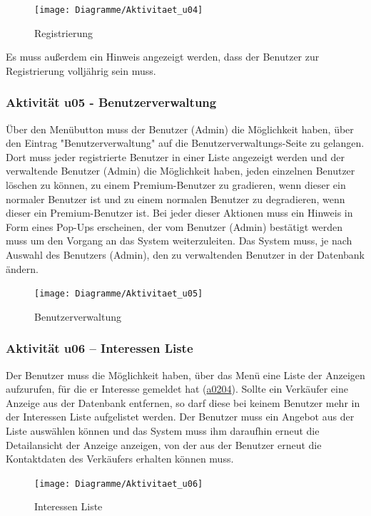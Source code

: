 \documentclass[a4paper,12pt,oneside]{scrartcl}
\begin{document}
\begin{figure}[!htbp]
\centering
\noindent\texttt{[image: Diagramme/Aktivitaet\_u04]}
\caption{Registrierung}
\end{figure}
\FloatBarrier
Es muss außerdem ein Hinweis angezeigt werden, dass der Benutzer zur Registrierung volljährig sein muss.



\subsubsection{Aktivität u05 - Benutzerverwaltung}
Über den Menübutton muss der Benutzer (Admin) die Möglichkeit haben, über den Eintrag "Benutzerverwaltung" auf die Benutzerverwaltungs-Seite zu gelangen. 
Dort muss jeder registrierte Benutzer in einer Liste angezeigt werden und der verwaltende Benutzer (Admin) die Möglichkeit haben, jeden einzelnen Benutzer löschen zu können, zu einem Premium-Benutzer zu gradieren, wenn dieser ein normaler Benutzer ist und zu einem normalen Benutzer zu degradieren, wenn dieser ein Premium-Benutzer ist. 
Bei jeder dieser Aktionen muss ein Hinweis in Form eines Pop-Ups erscheinen, der vom Benutzer (Admin) bestätigt werden muss um den Vorgang an das System weiterzuleiten. 
Das System muss, je nach Auswahl des Benutzers (Admin), den zu verwaltenden Benutzer in der Datenbank ändern.

\begin{figure}[!htbp]
\centering
\noindent\texttt{[image: Diagramme/Aktivitaet\_u05]}
\caption{Benutzerverwaltung}
\end{figure}
\FloatBarrier


\subsubsection{Aktivität u06 – Interessen Liste}
Der Benutzer muss die Möglichkeit haben, über das Menü eine Liste der Anzeigen aufzurufen, für die er Interesse gemeldet hat (\hyperlink{u02}{a0204}).
Sollte ein Verkäufer eine Anzeige aus der Datenbank entfernen, so darf diese bei keinem Benutzer mehr in der Interessen Liste aufgelistet werden.
Der Benutzer muss ein Angebot aus der Liste auswählen können und das System muss ihm daraufhin erneut die Detailansicht der Anzeige anzeigen, von der aus der Benutzer erneut die Kontaktdaten des Verkäufers erhalten können muss.

\begin{figure}[!htbp]
\centering
\noindent\texttt{[image: Diagramme/Aktivitaet\_u06]}
\caption{Interessen Liste}
\end{figure}
\FloatBarrier
\end{document}
